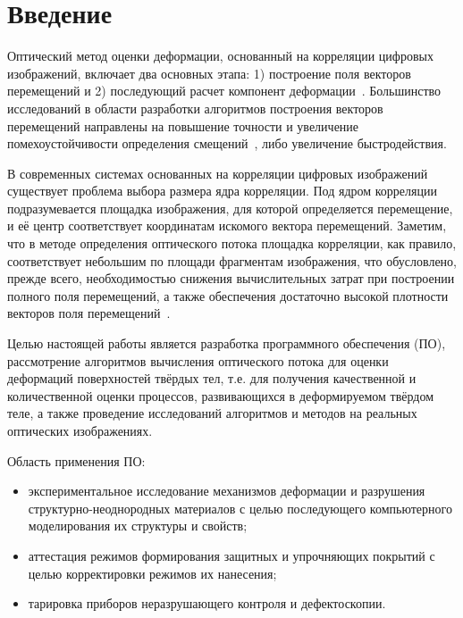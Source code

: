 \newpage
\section{Введение}



Оптический метод оценки деформации, основанный на корреляции цифровых изображений, включает два основных этапа: 1) построение поля векторов перемещений и 2) последующий расчет компонент деформации~\cite{pan_intro_one}. Большинство исследований в области разработки алгоритмов построения векторов перемещений направлены на повышение точности и увеличение помехоустойчивости определения смещений~\cite{pan_intro_two, pan_intro_three}, либо увеличение быстродействия.

В современных системах основанных на корреляции цифровых изображений существует проблема выбора размера ядра корреляции. Под ядром корреляции подразумевается площадка изображения, для которой определяется перемещение, и её центр соответствует координатам искомого вектора перемещений. Заметим, что в методе определения оптического потока площадка корреляции, как правило, соответствует небольшим по площади фрагментам изображения, что обусловлено, прежде всего, необходимостью снижения вычислительных затрат при построении полного поля перемещений, а также обеспечения достаточно высокой плотности векторов поля перемещений~\cite{tom_lyk, Lucas1981}.

Целью настоящей работы является разработка программного обеспечения (ПО), рассмотрение алгоритмов вычисления оптического потока для оценки деформаций поверхностей твёрдых тел, т.е. для получения качественной и количественной оценки процессов, развивающихся в деформируемом твёрдом теле, а также проведение исследований алгоритмов и методов на реальных оптических изображениях.

Область применения ПО:
\begin{itemize}
\item экспериментальное исследование механизмов деформации и разрушения структурно-неоднородных материалов с целью последующего компьютерного моделирования их структуры и свойств;
\item аттестация режимов формирования защитных и упрочняющих покрытий с целью корректировки режимов их нанесения;
\item тарировка приборов неразрушающего контроля и дефектоскопии.
\end{itemize}

